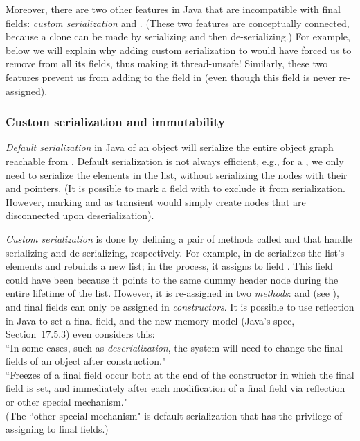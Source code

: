 Moreover, there are two other features in Java that are incompatible with {final} fields:
    \emph{custom serialization} and .
(These two features are conceptually connected,
    because a clone can be made by serializing and then de-serializing.)
For example, below we will explain why adding custom serialization to 
    would have forced us to remove  from all its fields,
    thus making it thread-unsafe!
Similarly, these two features prevent us from adding  to the 
    field in 
    (even though this field is never re-assigned).


\vspace{-0.2cm} %
\subsubsection{Custom serialization and immutability}
\emph{Default serialization} in Java of an object 
    will serialize the entire object graph reachable from .
Default serialization is not always efficient, e.g.,
    for a , we only need to serialize the elements in the list,
    without serializing the nodes with their  and  pointers.
(It is possible to mark a field with  to exclude it from serialization.
    However, marking  and  as transient would simply create nodes
        that are disconnected upon deserialization).

\emph{Custom serialization} is done by defining a pair of methods called
     and 
    that handle serializing and de-serializing, respectively.
For example,  in 
    de-serializes the list's elements and rebuilds a new list;
    in the process, it assigns to field .
This field could have been  because it points to the same dummy header node
    during the entire lifetime of the list.
However, it is re-assigned in two \emph{methods}:
     and  (see ),
    and final fields can only be assigned in
    \emph{constructors}.
It is possible to use reflection in Java to set a final field,
    and the new memory model (Java's spec, Section~17.5.3)
    even considers this:\\
``In some cases, such as \emph{deserialization}, the system will need to change
    the final fields of an object after construction."\\
``Freezes of a final field occur both at the end of the constructor in which the final field is set,
    and immediately after each modification of a final field via reflection or other special mechanism."\\
(The ``other special mechanism" is default serialization that has the privilege of assigning to final fields.)

